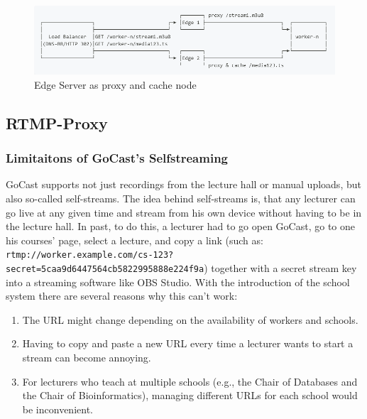 \begin{figure}[htpb]
    \centering
    \includegraphics[width=\linewidth]{images/EdgeNetwork.png}
    \caption[Edge Server as proxy and cache node]{Edge Server as proxy and cache node}\label{fig:edge-network}
\end{figure}


\subsection{RTMP-Proxy}

\subsubsection{Limitaitons of GoCast's Selfstreaming}

GoCast supports not just recordings from the lecture hall or manual uploads, but also so-called self-streams. The idea behind self-streams is, that any lecturer can go live at any given time and stream from his own device without having to be in the lecture hall. In past, to do this, a lecturer had to go open GoCast, go to one his courses' page, select a lecture, and copy a link (such as: \texttt{rtmp://worker.example.com/cs-123? secret=5caa9d6447564cb5822995888e224f9a}) together with a secret stream key into a streaming software like OBS Studio. With the introduction of the school system there are several reasons why this can't work:

\begin{enumerate}
    \item The URL might change depending on the availability of workers and schools.
    \item Having to copy and paste a new URL every time a lecturer wants to start a stream can become annoying.
    \item For lecturers who teach at multiple schools (e.g., the Chair of Databases and the Chair of Bioinformatics), managing different URLs for each school would be inconvenient.
\end{enumerate}

